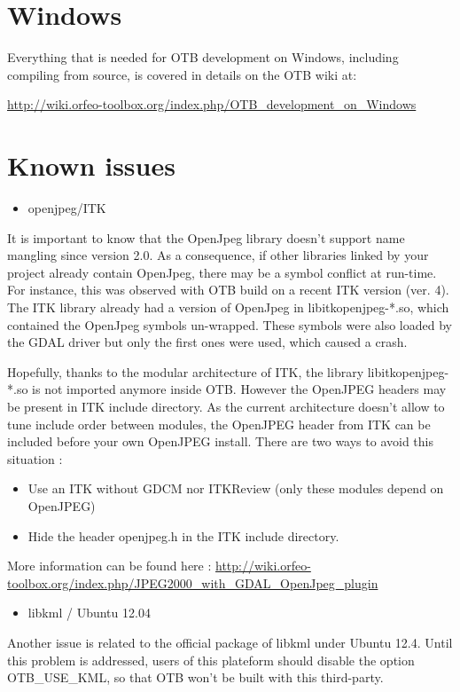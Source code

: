 \section{Windows}
\label{sec:compiling-windows}

Everything that is needed for OTB development on Windows, including compiling from source, is covered in details on the OTB wiki at:
\begin{center}
\url{http://wiki.orfeo-toolbox.org/index.php/OTB_development_on_Windows}
\end{center}

\section{Known issues}
\label{sec:knownissues}

\begin{itemize}
\item  openjpeg/ITK 
\end{itemize}

It is important to know that the OpenJpeg library doesn't support name mangling since version 2.0. 
As a consequence, if other libraries linked by your project already contain OpenJpeg, there may be a symbol conflict at run-time. 
For instance, this was observed with OTB build on a recent ITK version (ver. 4). 
The ITK library already had a version of OpenJpeg in libitkopenjpeg-*.so, which contained the OpenJpeg symbols un-wrapped.
These symbols were also loaded by the GDAL driver but only the first ones were used, which caused a crash. 

Hopefully, thanks to the modular architecture of ITK, the library libitkopenjpeg-*.so is not imported anymore inside OTB.
However the OpenJPEG headers may be present in ITK include directory. As the current architecture doesn't allow to tune 
include order between modules, the OpenJPEG header from ITK can be included before your own OpenJPEG install. There are
two ways to avoid this situation :
\begin{itemize}
\item Use an ITK without GDCM nor ITKReview (only these modules depend on OpenJPEG)
\item Hide the header openjpeg.h in the ITK include directory.
\end{itemize}

More information can be found here : \url{http://wiki.orfeo-toolbox.org/index.php/JPEG2000_with_GDAL_OpenJpeg_plugin}

\begin{itemize}
\item  libkml / Ubuntu 12.04 
\end{itemize}

Another issue is related to the official package of libkml under Ubuntu 12.4.
Until this problem is addressed, users of this plateform should disable the option OTB\_USE\_KML, so that OTB won't be built with this third-party.


